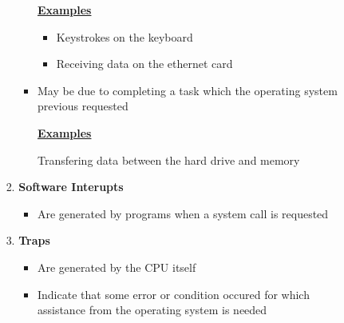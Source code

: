 \documentclass[12pt]{article}
\begin{document}
\begin{enumerate}[1.]
\begin{itemize}
\begin{itemize}
\begin{enumerate}[1)]
\begin{itemize}
                    \bigskip

                    \underline{\textbf{Examples}}

                    \bigskip

                    \begin{itemize}
                        \item Keystrokes on the keyboard
                        \item Receiving data on the ethernet card
                    \end{itemize}

                    \bigskip

                    \item May be due to completing a task which the operating system previous requested

                    \bigskip

                    \underline{\textbf{Examples}}

                    \bigskip

                    Transfering data between the hard drive and memory
                \end{itemize}

                \bigskip

                \item \textbf{Software Interupts}

                \bigskip

                \begin{itemize}
                    \item Are generated by programs when a system call is requested
                \end{itemize}

                \bigskip

                \item \textbf{Traps}

                \bigskip

                \begin{itemize}
                    \item Are generated by the CPU itself
                    \item Indicate that some error or condition occured for which assistance from the operating system is needed
                \end{itemize}

                \bigskip
            \end{enumerate}
        \end{itemize}


\end{itemize}
\end{enumerate}
\end{document}

